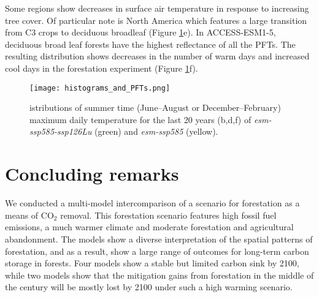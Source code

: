 \documentclass[draft]{agujournal2019}
\begin{document}
Some regions show decreases in surface air temperature in response to increasing tree cover.
Of particular note is North America which features a large transition from C3 crops to deciduous broadleaf (Figure \ref{fig:tasmax_distribution}e).
In ACCESS-ESM1-5, deciduous broad leaf forests have the highest reflectance of all the PFTs.
The resulting distribution shows decreases in the number of warm days and increased cool days in the forestation experiment (Figure \ref{fig:tasmax_distribution}f).


\begin{figure}
    \texttt{[image: histograms\_and\_PFTs.png]}
    \caption{
    istributions of summer time (June--August or December--February) maximum daily temperature for the last 20 years (b,d,f) of \textit{esm-ssp585-ssp126Lu} (green) and \textit{esm-ssp585} (yellow).}
    \label{fig:tasmax_distribution}
\end{figure}

\section{Concluding remarks}

We conducted a multi-model intercomparison of a scenario for forestation as a means of CO$_2$ removal.
This forestation scenario features high fossil fuel emissions, a much warmer climate and moderate forestation and agricultural abandonment.
The models show a diverse interpretation of the spatial patterns of forestation, and as a result, show a large range of outcomes for long-term carbon storage in forests.
Four models show a stable but limited carbon sink by 2100, while two models show that the mitigation gains from forestation in the middle of the century will be mostly lost by 2100 under such a high warming scenario.
\end{document}
